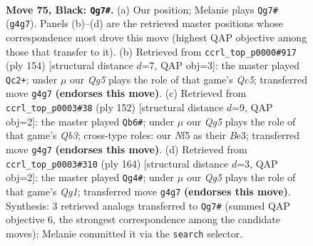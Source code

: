 \documentclass[11pt]{article}
\begin{document}
\clearpage

\begin{figure}[p]\centering
\begin{subfigure}{0.46\textwidth}\centering
\resizebox{\linewidth}{!}{%
\newchessgame
\chessboard[
  setfen={1k6/7K/8/5n2/6q1/8/3N4/8 b - - 5 75},
  showmover=false,
  pgfstyle=straightmove, color=movearrow, markmove={g4-g7}
]}
\caption{}
\end{subfigure}\hfill
\begin{subfigure}{0.46\textwidth}\centering
\resizebox{\linewidth}{!}{%
\newchessgame
\chessboard[
  setfen={8/8/8/2Q5/3N4/4K3/1k6/8 w - - 9 78},
  showmover=false,
  pgfstyle=straightmove, color=movearrow, markmove={c5-c2}
]}
\caption{}
\end{subfigure}
\\[4pt]
\begin{subfigure}{0.46\textwidth}\centering
\resizebox{\linewidth}{!}{%
\newchessgame
\chessboard[
  setfen={8/6K1/k7/8/8/1Q2B3/8/8 w - - 3 77},
  showmover=false,
  pgfstyle=straightmove, color=movearrow, markmove={b3-b6}
]}
\caption{}
\end{subfigure}\hfill
\begin{subfigure}{0.46\textwidth}\centering
\resizebox{\linewidth}{!}{%
\newchessgame
\chessboard[
  setfen={8/8/8/8/7k/4N3/1K6/6Q1 w - - 1 83},
  showmover=false,
  pgfstyle=straightmove, color=movearrow, markmove={g1-g4}
]}
\caption{}
\end{subfigure}
\caption{\textbf{Move 75, Black: \texttt{Qg7\#}.} (a) Our position; Melanie plays \texttt{Qg7\#} (\texttt{g4g7}). Panels (b)--(d) are the retrieved master positions whose correspondence most drove this move (highest QAP objective among those that transfer to it). (b) Retrieved from \texttt{ccrl\_top\_p0000\#917} (ply 154) [structural distance $d$=7, QAP obj=3]: the master played \texttt{Qc2+}; under $\mu$ our \emph{Qg5} plays the role of that game's \emph{Qc5}; transferred move \texttt{g4g7} \textbf{(endorses this move)}. (c) Retrieved from \texttt{ccrl\_top\_p0003\#38} (ply 152) [structural distance $d$=9, QAP obj=2]: the master played \texttt{Qb6\#}; under $\mu$ our \emph{Qg5} plays the role of that game's \emph{Qb3}; cross-type roles: our \emph{N}f5 as their \emph{B}e3; transferred move \texttt{g4g7} \textbf{(endorses this move)}. (d) Retrieved from \texttt{ccrl\_top\_p0003\#310} (ply 164) [structural distance $d$=3, QAP obj=2]: the master played \texttt{Qg4\#}; under $\mu$ our \emph{Qg5} plays the role of that game's \emph{Qg1}; transferred move \texttt{g4g7} \textbf{(endorses this move)}. Synthesis: 3 retrieved analogs transferred to \texttt{Qg7\#} (summed QAP objective 6, the strongest correspondence among the candidate moves); Melanie committed it via the \texttt{search} selector.}
\label{fig:thought-m149}
\end{figure}
\end{document}
